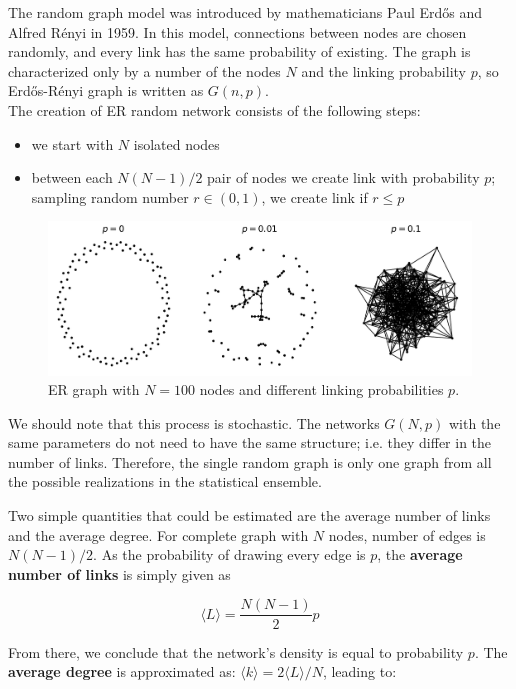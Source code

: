 The random graph model was introduced by mathematicians Paul Erdős and Alfred R\' {e}nyi in 1959. In this model, connections between nodes are chosen randomly, and every link has the same probability of existing. The graph is characterized only by a number of the nodes $N$ and the linking probability $p$, so Erdős-R\' {e}nyi graph is written as $G(n, p)$. \\

The creation of ER random network consists of the following steps:
\begin{itemize}
	\item we start with $N$ isolated nodes
	\item between each $N(N-1)/2$ pair of nodes we create link with probability $p$; sampling random number $r \in (0,1)$, we create link if $r \leq p$    
\end{itemize}


\begin{figure}[h!]
	\centering
	\includegraphics[width=0.9\linewidth]{figures/methodology/ERgraph}
	\caption{ER graph with $N=100$ nodes and different linking probabilities $p$.}
	\label{fig:erp}
\end{figure}

We should note that this process is stochastic. The networks $G(N, p)$ with the same parameters do not need to have the same structure; i.e. they differ in the number of links. Therefore, the single random graph is only one graph from all the possible realizations in the statistical ensemble. 

Two simple quantities that could be estimated are the average number of links and the average degree. For complete graph with $N$ nodes, number of edges is $N(N-1)/2$. As the probability of drawing every edge is $p$, the \textbf{average number of links} is simply given as 

\begin{equation}
\langle L \rangle = \frac{N(N-1)}{2}p
\end{equation}

From there, we conclude that the network's density is equal to probability $p$.
The \textbf{average degree} is approximated as: $\langle k \rangle = 2 \langle L \rangle / N $, leading to:

